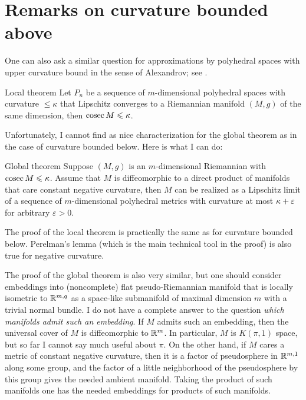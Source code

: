 \documentclass{article}
\begin{document}
\section{Remarks on curvature bounded above}

One can also ask a similar question for approximations by polyhedral spaces 
with upper curvature bound in the sense of Alexandrov; see \cite{AKP}.


\begin{thm}{Local theorem}
Let $P_n$ be a sequence of $m$-dimensional
polyhedral spaces
with curvature $\le \kappa$ that Lipschitz converges to a
Riemannian manifold $(M,g)$ of the same dimension, then $\mathop{\rm cosec}\nolimits M\leqslant \kappa$.
\end{thm}

Unfortunately, I cannot find as nice characterization for the global theorem
as in the case of curvature bounded below. Here is what I can do:


\begin{thm}{Global theorem}
Suppose $(M,g)$ is an $m$-dimensional Riemannian with $\cosec M\z\le \kappa$.
Assume that $M$ is diffeomorphic to a direct product of manifolds that care constant negative curvature, then $M$ can be realized as a Lipschitz limit of a sequence of $m$-dimensional polyhedral metrics with curvature at most $\kappa+\varepsilon$ for arbitrary $\varepsilon>0$.
\end{thm}

The proof of the local theorem is practically the same as for curvature bounded 
below. Perelman's lemma (which is the main technical tool in the proof) is 
also true for negative curvature.

The proof of the global theorem is also very similar, but one should consider 
embeddings into (noncomplete) flat pseudo-Riemannian manifold that is locally isometric to $\mathbb{R}^{m,q}$ as a space-like submanifold of maximal dimension $m$ with a trivial normal bundle.
I do not have a complete answer to the question \textit{which manifolds admit such an embedding}.
If $M$ admits such an embedding, then the universal cover of $M$ is diffeomorphic to $\mathbb{R}^m$. 
In particular, $M$ is $K(\pi,1)$ space, but so far I cannot say much useful 
about $\pi$.
On the other hand, if $M$ cares a metric of constant negative curvature, then it is a factor of pseudosphere in $\mathbb{R}^{m,1}$ along some group,
and the factor of a little neighborhood of the pseudosphere by this group gives the needed ambient manifold.
Taking the product of such manifolds one has the needed embeddings for products of such manifolds.
\end{document}
